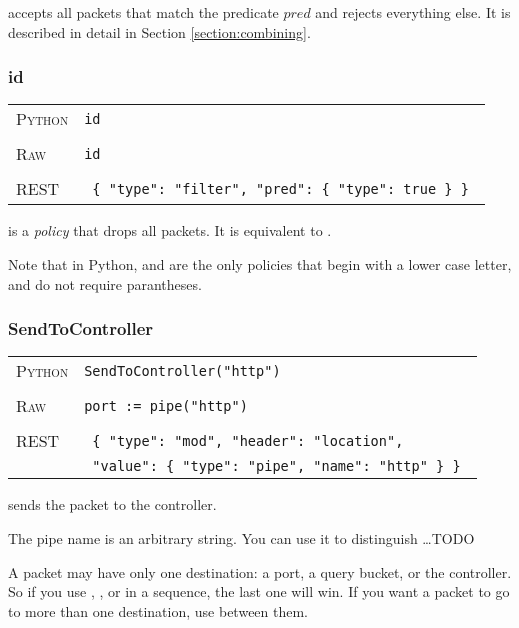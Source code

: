  accepts all packets that match the predicate $pred$ and rejects everything else.
It is described in detail in Section \ref{section:combining}.

\subsubsection{id}

\bigskip
\begin{tabularx}{\linewidth}{lX}
\textsc{Python}   & \texttt{id} \\ \\
\textsc{Raw}   & \texttt{id} \\ \\
\textsc{REST} & \texttt{ \{ "type": "filter", "pred": \{ "type": true \} \} } 
\end{tabularx}

 is a \emph{policy} that drops all packets.  It is equivalent to .

Note that in Python,  and  are the only policies that begin with a lower case
letter, and do not require parantheses.  

\subsubsection{SendToController}

\bigskip
\begin{tabularx}{\linewidth}{lX}
\textsc{Python}   & \texttt{SendToController("http")} \\ \\
\textsc{Raw}    & \texttt{port := pipe("http")}     \\ \\
\textsc{REST} & \texttt{ \{ "type": "mod", "header": "location", } \\
 & \texttt{ "value": \{ "type": "pipe", "name": "http" \} \} } 
\end{tabularx}

 sends the packet to the controller.   

The pipe name is an arbitrary string.  You can use it to distinguish \ldots TODO

A packet may have only one destination: a port, a query bucket, or the controller.  So if you use 
, , or  in a sequence, the last one will
win.  If you want a packet to go to more than one destination, use  between them.    

